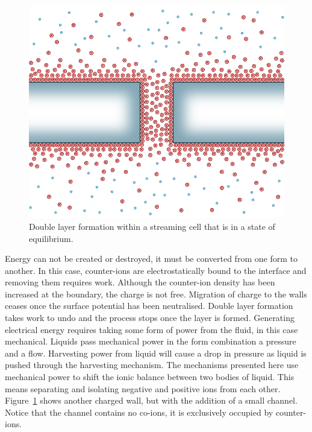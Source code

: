   \begin{figure}
      \centering
      \includegraphics{content/pt1/01-PowerHarvesting/graphics/intro_2_channel_relaxed}
      \caption{
        \label{fig:doubleLayerInChannel_noPressure}
        Double layer formation within a streaming cell that is in a state of equilibrium.
      }
  \end{figure}
  Energy can not be created or destroyed, it must be converted from one form to another.
  In this case, counter-ions are electrostatically bound to the interface and removing them requires work.
  Although the counter-ion density has been increased at the boundary, the charge is not free.
  Migration of charge to the walls ceases once the surface potential has been neutralised.
  Double layer formation takes work to undo and the process stops once the layer is formed.
  Generating electrical energy requires taking some form of power from the fluid, in this case mechanical.
  Liquids pass mechanical power in the form combination a pressure and a flow.
  Harvesting power from liquid will cause a drop in pressure as liquid is pushed through the harvesting mechanism.
  The mechanisms presented here use mechanical power to shift the ionic balance between two bodies of liquid.
  This means separating and isolating negative and positive ions from each other.  
  Figure~\ref{fig:doubleLayerInChannel_noPressure} shows another charged wall, but with the addition of a small channel.
  Notice that the channel contains no co-ions, it is exclusively occupied by counter-ions.
